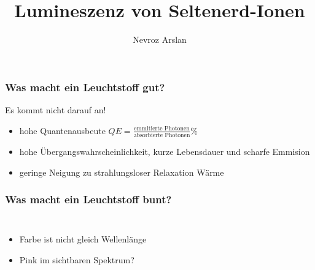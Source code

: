 \documentclass{beamer}
\title{Lumineszenz von Seltenerd-Ionen}
\author{Nevroz Arslan}
\newcommand{\makemycolor}[2]{%
    \pgfmathsetmacro{\hue}{(#1/100)^1.715*0.79}%
    \definecolor{myhsbcolor}{hsb}{\hue,1,1}%
    \textcolor{myhsbcolor}{#2}%
}
\begin{document}
  {%
    \frame{\titlepage}
  }

\begin{frame}[t]\frametitle{Was macht ein Leuchtstoff gut?}
Es kommt nicht darauf an!
\begin{itemize}
   \item hohe Quantenausbeute $QE = \frac{\text{emmitierte \ Photonen}}{\text{absorbierte Photonen}}\%$
   \item hohe Übergangswahrscheinlichkeit, kurze Lebensdauer und scharfe Emmision 
   \item geringe Neigung zu strahlungsloser Relaxation  Wärme
\end{itemize}
   
\end{frame}

\begin{frame}[t]\frametitle{Was macht ein Leuchtstoff bunt?}
\begin{columns}
    \begin{itemize}
    \item Farbe ist nicht gleich Wellenlänge
    \item Pink im sichtbaren Spektrum? 
    \end{itemize}

\end{columns}

\end{frame}


 
\end{document}
